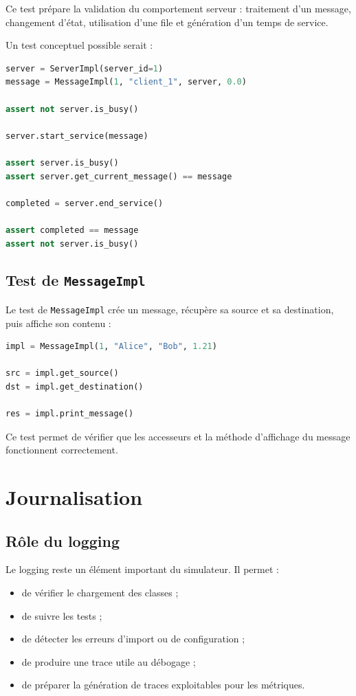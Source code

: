 \documentclass{article}
\begin{document}
Ce test prépare la validation du comportement serveur : traitement d’un message, changement d’état, utilisation d’une file et génération d’un temps de service.

Un test conceptuel possible serait :

\begin{lstlisting}[language=Python, caption=Test conceptuel d'un serveur]
server = ServerImpl(server_id=1)
message = MessageImpl(1, "client_1", server, 0.0)

assert not server.is_busy()

server.start_service(message)

assert server.is_busy()
assert server.get_current_message() == message

completed = server.end_service()

assert completed == message
assert not server.is_busy()
\end{lstlisting}

\subsection{Test de \texttt{MessageImpl}}

Le test de \texttt{MessageImpl} crée un message, récupère sa source et sa destination, puis affiche son contenu :

\begin{lstlisting}[language=Python, caption=Extrait de MessageImplTest.py]
impl = MessageImpl(1, "Alice", "Bob", 1.21)

src = impl.get_source()
dst = impl.get_destination()

res = impl.print_message()
\end{lstlisting}

Ce test permet de vérifier que les accesseurs et la méthode d’affichage du message fonctionnent correctement.

\section{Journalisation}

\subsection{Rôle du logging}

Le logging reste un élément important du simulateur. Il permet :
\begin{itemize}[leftmargin=*]
    \item de vérifier le chargement des classes ;
    \item de suivre les tests ;
    \item de détecter les erreurs d’import ou de configuration ;
    \item de produire une trace utile au débogage ;
    \item de préparer la génération de traces exploitables pour les métriques.
\end{itemize}
\end{document}
